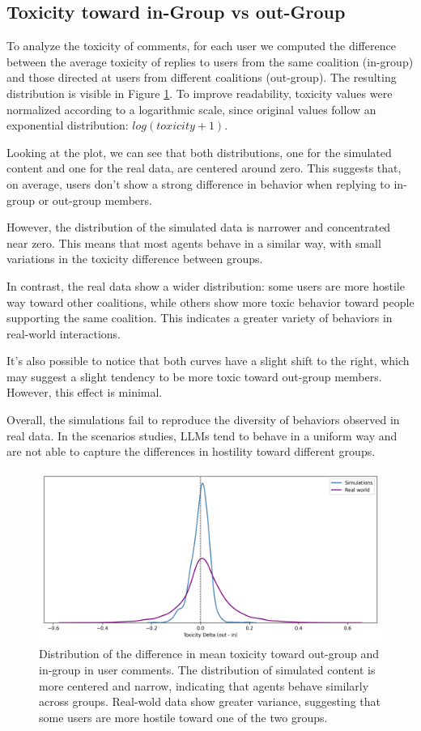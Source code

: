 \subsection{Toxicity toward in-Group vs out-Group}
To analyze the toxicity of comments, for each user we computed the difference between the average toxicity of replies to users from the same coalition (in-group) and those directed at users from different coalitions (out-group).
The resulting distribution is visible in Figure \ref{fig:toxicity_in_out}.
To improve readability, toxicity values were normalized according to a logarithmic scale, since original values follow an exponential distribution: $log(toxicity + 1)$.

Looking at the plot, we can see that both distributions, one for the simulated content and one for the real data, are centered around zero.
This suggests that, on average, users don't show a strong difference in behavior when replying to in-group or out-group members.

However, the distribution of the simulated data is narrower and concentrated near zero.
This means that most agents behave in a similar way, with small variations in the toxicity difference between groups.

In contrast, the real data show a wider distribution: some users are more hostile way toward other coalitions, while others show more toxic behavior toward people supporting the same coalition.
This indicates a greater variety of behaviors in real-world interactions.

It's also possible to notice that both curves have a slight shift to the right, which may suggest a slight tendency to be more toxic toward out-group members. However, this effect is minimal.

Overall, the simulations fail to reproduce the diversity of behaviors observed in real data. 
In the scenarios studies, LLMs tend to behave in a uniform way and are not able to capture the differences in hostility toward different groups.


\begin{figure}[h]
    \centering
    \includegraphics[width=0.6\linewidth]{Images/Toxicity/diff_in_out_combined.png}
    \caption{
    Distribution of the difference in mean toxicity toward out-group and in-group in user comments.
    The distribution of simulated content is more centered and narrow, indicating that agents behave similarly across groups.
    Real-wold data show greater variance, suggesting that some users are more hostile toward one of the two groups.
    }
    \label{fig:toxicity_in_out}
\end{figure}


